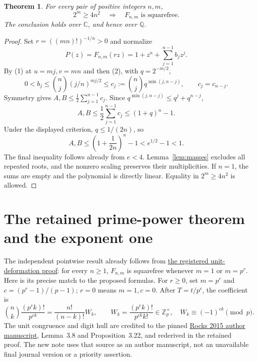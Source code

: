 \documentclass[11pt]{article}
\newtheorem{theorem}{Theorem}
\newcommand{\Q}{\mathbb Q}
\newcommand{\C}{\mathbb C}
\newcommand{\Z}{\mathbb Z}
\begin{document}
\begin{theorem}\label{thm:large}
For every pair of positive integers $n,m$,
\[
 \boxed{2^m\ge4n^2\quad\Longrightarrow\quad F_{n,m}\text{ is squarefree}.}
\]
The conclusion holds over $\C$, and hence over $\Q$.
\end{theorem}
\begin{proof}
Set $r=((mn)!)^{-1/n}>0$ and normalize
\[
 P(z)=F_{n,m}(rz)=1+z^n+\sum_{j=1}^{n-1}b_jz^j.
\]
By (1) at $u=mj,v=mn$ and then (2), with $q=2^{-m/2}$,
\[
 0<b_j\le\binom nj(j/n)^{mj/2}
 \le c_j:=\binom nj q^{\min(j,n-j)},\qquad c_j=c_{n-j}.
\]
Symmetry gives $A,B\le\frac12\sum_{j=1}^{n-1}c_j$.
Since $q^{\min(j,n-j)}\le q^j+q^{n-j}$,
\[
 A,B\le\frac12\sum_{j=1}^{n-1}c_j\le(1+q)^n-1.
\]
Under the displayed criterion, $q\le1/(2n)$, so
\[
 A,B\le\left(1+\frac1{2n}\right)^n-1
 <e^{1/2}-1<1.
\]
The final inequality follows already from $e<4$.
Lemma~\ref{lem:masses} excludes all repeated roots, and the nonzero scaling
preserves their multiplicities. If $n=1$, the sums are empty and the
polynomial is directly linear. Equality in $2^m\ge4n^2$ is allowed.
\end{proof}

\section{The retained prime-power theorem and the exponent one}
The independent pointwise result already follows from
\href{PRIME_POWER_TWO_TERM_SFC.tex}{the registered unit-deformation proof}:
for every $n\ge1$, $F_{n,m}$ is squarefree whenever $m=1$ or $m=p^r$.
Here is its precise match to the proposed formulas.
For $r\ge0$, set $m=p^r$ and $c=(p^r-1)/(p-1)$; $r=0$ means $m=1,c=0$.
After $T=t/p^c$, the coefficient is
\[
 \binom nk\frac{(p^rk)!}{p^{ck}}
 =\frac{n!}{(n-k)!}W_k,\qquad
 W_k=\frac{(p^rk)!}{p^{ck}k!}\in\Z_p^\times,
 \quad W_k\equiv(-1)^{ck}\pmod p.
\]
The unit congruence and digit hull are credited to the pinned
\href{sources/rocks-2015-author-preprint.pdf}{Rocks 2015 author manuscript},
Lemma~3.8 and Proposition~3.22, and rederived in the retained proof.
The new note uses that source as an author manuscript, not an unavailable
final journal version or a priority assertion.
\end{document}
